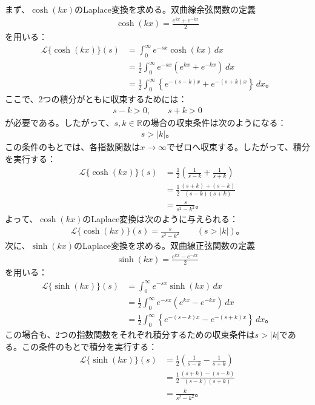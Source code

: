 \documentclass[platex,dvipdfmx,a4paper]{jsarticle}
\begin{document}
  まず、$\cosh(kx)$のLaplace変換を求める。双曲線余弦関数の定義
  \begin{align*}
    \cosh(kx)=\frac{e^{kx}+e^{-kx}}{2}
  \end{align*}
  を用いる：
  \begin{align*}
    \mathcal{L}\{\cosh(kx)\}(s)
    &=\int_0^\infty e^{-sx}\cosh(kx)\,dx\\
    &=\frac{1}{2}\int_0^\infty e^{-sx}\left(e^{kx}+e^{-kx}\right)\,dx\\
    &=\frac{1}{2}\int_0^\infty\left\{e^{-(s-k)x}+e^{-(s+k)x}\right\}\,dx。
  \end{align*}
  ここで、2つの積分がともに収束するためには：
  \begin{align*}
    s-k>0,
    \qquad
    s+k>0
  \end{align*}
  が必要である。したがって、$s,k\in\mathbb{R}$の場合の収束条件は次のようになる：
  \begin{align*}
    s>|k|。
  \end{align*}
  この条件のもとでは、各指数関数は$x\longrightarrow\infty$でゼロへ収束する。したがって、積分を実行する：
  \begin{align*}
    \mathcal{L}\{\cosh(kx)\}(s)
    &=\frac{1}{2}\left(\frac{1}{s-k}+\frac{1}{s+k}\right)\\
    &=\frac{1}{2}\frac{(s+k)+(s-k)}{(s-k)(s+k)}\\
    &=\frac{s}{s^2-k^2}。
  \end{align*}
  よって、$\cosh(kx)$のLaplace変換は次のように与えられる：
  \begin{align*}
    \mathcal{L}\{\cosh(kx)\}(s)
    =\frac{s}{s^2-k^2}
    \qquad(s>|k|)。
  \end{align*}
  次に、$\sinh(kx)$のLaplace変換を求める。双曲線正弦関数の定義
  \begin{align*}
    \sinh(kx)=\frac{e^{kx}-e^{-kx}}{2}
  \end{align*}
  を用いる：
  \begin{align*}
    \mathcal{L}\{\sinh(kx)\}(s)
    &=\int_0^\infty e^{-sx}\sinh(kx)\,dx\\
    &=\frac{1}{2}\int_0^\infty e^{-sx}\left(e^{kx}-e^{-kx}\right)\,dx\\
    &=\frac{1}{2}\int_0^\infty\left\{e^{-(s-k)x}-e^{-(s+k)x}\right\}\,dx。
  \end{align*}
  この場合も、2つの指数関数をそれぞれ積分するための収束条件は$s>|k|$である。この条件のもとで積分を実行する：
  \begin{align*}
    \mathcal{L}\{\sinh(kx)\}(s)
    &=\frac{1}{2}\left(\frac{1}{s-k}-\frac{1}{s+k}\right)\\
    &=\frac{1}{2}\frac{(s+k)-(s-k)}{(s-k)(s+k)}\\
    &=\frac{k}{s^2-k^2}。
  \end{align*}
\end{document}
